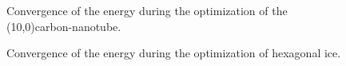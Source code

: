 \documentclass[prl,aps,preprint,superbib,12pt]{revtex4}
\begin{document}
\begin{figure}[h]
\caption{Convergence of the energy during the optimization
of the (10,0)carbon-nanotube.}
\label{NANO-energ}
\end{figure}

\begin{figure}[h]
\caption{Convergence of the energy during the optimization
of hexagonal ice.}
\label{ICE-energ}
\end{figure}
\end{document}
